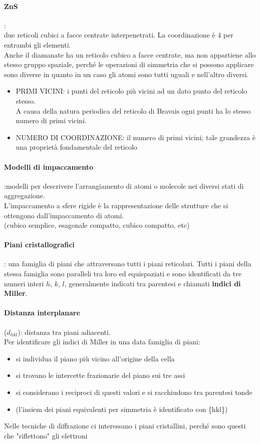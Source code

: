 \documentclass{article}
\begin{document}
\paragraph{ZnS}:\\
due reticoli cubici a facce centrate interpenetrati. La coordinazione è 4 per entrambi gli elementi.\\
Anche il diamanate ha un reticolo cubico a facce centrate, ma non appartiene allo stesso gruppo spaziale, perché le operazioni di simmetria che si possono applicare sono diverse in quanto in un caso gli atomi sono tutti uguali e nell'altro diversi.


\begin{itemize}
    \item PRIMI VICINI: i punti del reticolo più vicini ad un dato punto del reticolo stesso.\\
    A causa della natura periodica del reticolo di Bravais ogni punti ha lo stesso numero di primi vicini.
    \item NUMERO DI COORDINAZIONE: il numero di primi vicini; tale grandezza è una proprietà fondamentale del reticolo
\end{itemize}

\paragraph{Modelli di impaccamento}:modelli per descrivere l'arrangiamento di atomi o molecole nei diversi stati di aggregazione. \\
L'impaccamento a sfere rigide è la rappresentazione delle strutture che si ottengono dall'impaccamento di atomi.\\
(cubico semplice, esagonale compatto, cubico compatto, etc)

\paragraph{Piani cristallografici}: una famiglia di piani che attraversano tutti i piani reticolari. Tutti i piani della stessa famiglia sono paralleli tra loro ed equispaziati e sono identificati da tre numeri interi $h,\,k,\,l$, generalmente indicati tra parentesi e chiamati \textbf{indici di Miller}.
\paragraph{Distanza interplanare}($d_{hkl}$): distanza tra piani adiacenti. \\
Per identificare gli indici di Miller in una data famiglia di piani:
\begin{itemize}
    \item si individua il piano più vicino all'origine della cella
    \item si trovano le intercette frazionarie del piano sui tre assi
    \item si considerano i reciproci di questi valori e si racchiudono tra parentesi tonde
    \item (l'insiem dei piani equivalenti per simmetria è identificato con \{hkl\})
\end{itemize}
Nelle tecniche di diffrazione ci interessano i piani cristallini, perché sono questi che "riflettono" gli elettroni
\end{document}
